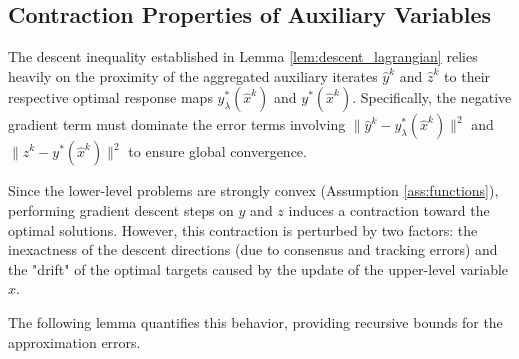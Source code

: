 \documentclass{article}
\theoremstyle{plain}
\theoremstyle{definition}
\theoremstyle{remark}
\begin{document}
\subsection{Contraction Properties of Auxiliary Variables} 
\label{app:fab_contract}


The descent inequality established in Lemma \ref{lem:descent_lagrangian} relies heavily on the proximity of the aggregated auxiliary iterates $\hat{y}^k$ and $\hat{z}^k$ to their respective optimal response maps $y_{\lambda}^*(\hat{x}^k)$ and $y^*(\hat{x}^k)$. Specifically, the negative gradient term must dominate the error terms involving $\|\hat{y}^{k}-y_{\lambda}^*(\hat{x}^{k})\|^{2}$ and $\|\hat{z}^{k}-y^*(\hat{x}^{k})\|^{2}$ to ensure global convergence.

Since the lower-level problems are strongly convex (Assumption \ref{ass:functions}), performing gradient descent steps on $y$ and $z$ induces a contraction toward the optimal solutions. However, this contraction is perturbed by two factors: the inexactness of the descent directions (due to consensus and tracking errors) and the "drift" of the optimal targets caused by the update of the upper-level variable $\hat{x}$.

The following lemma quantifies this behavior, providing recursive bounds for the approximation errors.
\end{document}
